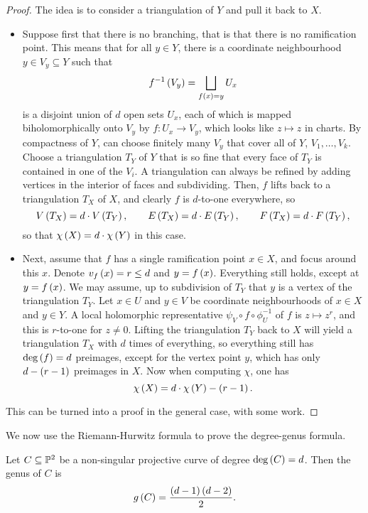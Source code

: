 \begin{proof}
The idea is to consider a triangulation of $ Y $ and pull it back to $ X $.
\begin{itemize}
\item Suppose first that there is no branching, that is that there is no ramification point. This means that for all $ y \in Y $, there is a coordinate neighbourhood $ y \in V_y \subseteq Y $ such that
$$ f^{-1}\rb{V_y} = \bigsqcup_{f\rb{x} = y} U_x $$
is a disjoint union of $ d $ open sets $ U_x $, each of which is mapped biholomorphically onto $ V_y $ by $ f : U_x \to V_y $, which looks like $ z \mapsto z $ in charts. By compactness of $ Y $, can choose finitely many $ V_y $ that cover all of $ Y $, $ V_1, \dots, V_k $. Choose a triangulation $ T_Y $ of $ Y $ that is so fine that every face of $ T_Y $ is contained in one of the $ V_i $. A triangulation can always be refined by adding vertices in the interior of faces and subdividing. Then, $ f $ lifts back to a triangulation $ T_X $ of $ X $, and clearly $ f $ is $ d $-to-one everywhere, so
$$ V\rb{T_X} = d \cdot V\rb{T_Y}, \qquad E\rb{T_X} = d \cdot E\rb{T_Y}, \qquad F\rb{T_X} = d \cdot F\rb{T_Y}, $$
so that $ \chi\rb{X} = d \cdot \chi\rb{Y} $ in this case.
\item Next, assume that $ f $ has a single ramification point $ x \in X $, and focus around this $ x $. Denote $ v_f\rb{x} = r \le d $ and $ y = f\rb{x} $. Everything still holds, except at $ y = f\rb{x} $. We may assume, up to subdivision of $ T_Y $ that $ y $ is a vertex of the triangulation $ T_Y $. Let $ x \in U $ and $ y \in V $ be coordinate neighbourhoods of $ x \in X $ and $ y \in Y $. A local holomorphic representative $ \psi_V \circ f \circ \phi_U^{-1} $ of $ f $ is $ z \mapsto z^r $, and this is $ r $-to-one for $ z \ne 0 $. Lifting the triangulation $ T_Y $ back to $ X $ will yield a triangulation $ T_X $ with $ d $ times of everything, so everything still has $ \deg\rb{f} = d $ preimages, except for the vertex point $ y $, which has only $ d - \rb{r - 1} $ preimages in $ X $. Now when computing $ \chi $, one has
$$ \chi\rb{X} = d \cdot \chi\rb{Y} - \rb{r - 1}. $$
\end{itemize}
This can be turned into a proof in the general case, with some work.
\end{proof}

\pagebreak

We now use the Riemann-Hurwitz formula to prove the degree-genus formula.

\begin{theorem}
Let $ C \subseteq \P^2 $ be a non-singular projective curve of degree $ \deg\rb{C} = d $. Then the genus of $ C $ is
$$ g\rb{C} = \dfrac{\rb{d - 1}\rb{d - 2}}{2}. $$
\end{theorem}

